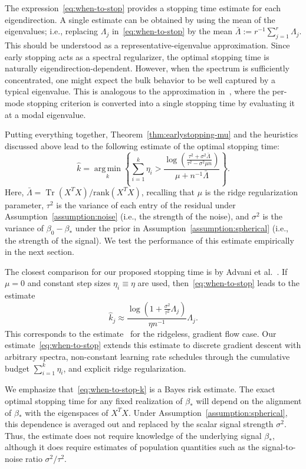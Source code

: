 \documentclass[11pt]{article}
\DeclareMathOperator*{\argmin}{arg\,min}
\DeclareMathOperator{\Tr}{Tr}
\begin{document}
The expression~\eqref{eq:when-to-stop} provides a stopping time estimate for each eigendirection. A single estimate can be obtained by using the mean of the eigenvalues; i.e., replacing $\Lambda_j$ in~\eqref{eq:when-to-stop} by the mean $\bar{\Lambda} := r^{-1} \sum_{j=1}^r \Lambda_j$.
This should be understood as a representative-eigenvalue approximation. Since early stopping acts as a spectral regularizer, the optimal stopping time is naturally eigendirection-dependent. However, when the spectrum is sufficiently concentrated, one might expect the bulk behavior to be well captured by a typical eigenvalue.
This is analogous to the approximation in~\cite{AdSaSo2020}, where the per-mode stopping criterion is converted into a single stopping time by evaluating it at a modal eigenvalue.

Putting everything together, Theorem~\ref{thm:earlystopping-mu} and the heuristics discussed above lead to the following estimate of the optimal stopping time:
\begin{equation} \label{eq:when-to-stop-k}
    \hat{k} = \argmin\limits_k \left\{\sum_{i=1}^{k} \eta_i > \frac{\log\left(\frac{\tau^2 + \sigma^2 \bar{\Lambda}}{\tau^2 - \sigma^2 \mu n}\right)}{\mu + n^{-1} \bar{\Lambda}} \right\}.
\end{equation}
Here, $\bar{\Lambda} = \Tr(X^T X)/ \mathrm{rank}(X^T X)$, recalling that $\mu$ is the ridge regularization parameter, $\tau^2$ is the variance of each entry of the residual under Assumption~\ref{assumption:noise} (i.e., the strength of the noise), and $\sigma^2$ is the variance of $\beta_0 - \beta_*$ under the prior in Assumption~\ref{assumption:spherical} (i.e., the strength of the signal). We test the performance of this estimate empirically in the next section.

The closest comparison for our proposed stopping time is by Advani et al.~\cite{AdSaSo2020}. If $\mu = 0$ and constant step sizes $\eta_i \equiv \eta$ are used, then~\eqref{eq:when-to-stop} leads to the estimate
\[
    \hat{k}_j \approx \frac{\log\left(1 + \frac{\sigma^2}{\tau^2}\Lambda_{j} \right)}{\eta n^{-1}} \Lambda_{j}.
\]
This corresponds to the estimate~\cite[Eq.\ (16)]{AdSaSo2020} for the ridgeless, gradient flow case.
Our estimate~\eqref{eq:when-to-stop} extends this estimate to discrete gradient descent with arbitrary spectra, non-constant learning rate schedules through the cumulative budget $\sum_{i=1}^k \eta_i$, and explicit ridge regularization.

We emphasize that~\eqref{eq:when-to-stop-k} is a Bayes risk estimate. The exact optimal stopping time for any fixed realization of $\beta_*$ will depend on the alignment of $\beta_*$ with the eigenspaces of $X^T X$. Under Assumption~\ref{assumption:spherical}, this dependence is averaged out and replaced by the scalar signal strength $\sigma^2$. Thus, the estimate does not require knowledge of the underlying signal $\beta_*$, although it does require estimates of population quantities such as the signal-to-noise ratio $\sigma^2 / \tau^2$.
\end{document}
